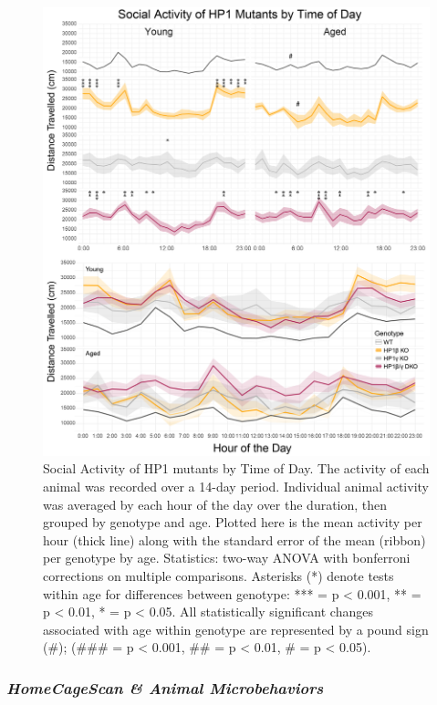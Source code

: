 \documentclass[onehalf,12pt]{beavtex}
\begin{document}
  \begin{figure}
  
  {\centering \includegraphics[width=0.85\linewidth, ]{./figure/results/SAMalt} 
  
  }
  
  \caption[Social Activity of HP1 mutants by Time of Day]{Social Activity of HP1 mutants by Time of Day.  The activity of each animal was recorded over a 14-day period.  Individual animal activity was averaged by each hour of the day over the duration, then grouped by genotype and age.  Plotted here is the mean activity per hour (thick line) along with the standard error of the mean (ribbon) per genotype by age.  Statistics: two-way ANOVA with bonferroni corrections on multiple comparisons. Asterisks (*) denote tests within age for differences between genotype: *** = p < 0.001, ** = p < 0.01, * = p < 0.05. All statistically significant changes associated with age within genotype are represented by a pound sign (\#); (\#\#\# = p < 0.001, \#\# = p < 0.01, \# = p < 0.05).}\label{fig:SAM}
  \end{figure}
  
  \FloatBarrier
  
  \subsubsection*{\texorpdfstring{\emph{HomeCageScan \& Animal
  Microbehaviors}}{HomeCageScan \& Animal Microbehaviors}}\label{homecagescan-animal-microbehaviors}
  
\end{document}
